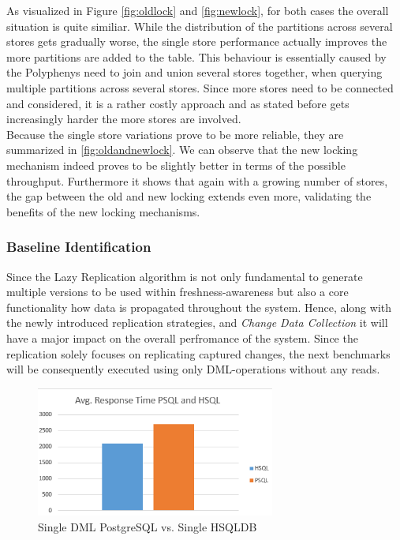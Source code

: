 As visualized in Figure \ref{fig:oldlock} and \ref{fig:newlock}, for both cases the overall situation is quite similiar.
While the distribution of the partitions across several stores gets gradually worse, the single store performance actually improves the more partitions are added to the table.
This behaviour is essentially caused by the Polyphenys need to join and union several stores together, when querying multiple partitions across several stores.
Since more stores need to be connected and considered, it is a rather costly approach and as stated before gets increasingly harder the more stores are involved.\\

Because the single store variations prove to be more reliable, they are summarized in \ref{fig:oldandnewlock}.
We can observe that the new locking mechanism indeed proves to be slightly better in terms of the possible throughput.
Furthermore it shows that again with a growing number of stores, the gap between the old and new locking extends even more, validating the benefits of the new locking mechanisms.






\subsubsection{Baseline Identification} 


Since the Lazy Replication algorithm is not only fundamental to generate multiple versions to be used within freshness-awareness
but also a core functionality how data is propagated throughout the system. 
Hence, along with the newly introduced replication strategies, and \emph{Change Data Collection} it will have a major impact on the overall perfromance of the system.
Since the replication solely focuses on replicating captured changes, the next benchmarks will be consequently executed using only DML-operations without any reads.\\

\begin{figure}[t] 
    \centering 
    \includegraphics[width=0.7\textwidth]{Figures/hsql_psql.png}
    \caption{Single DML PostgreSQL vs. Single HSQLDB}
    \label{fig:singlepsqlhsql}
\end{figure}

